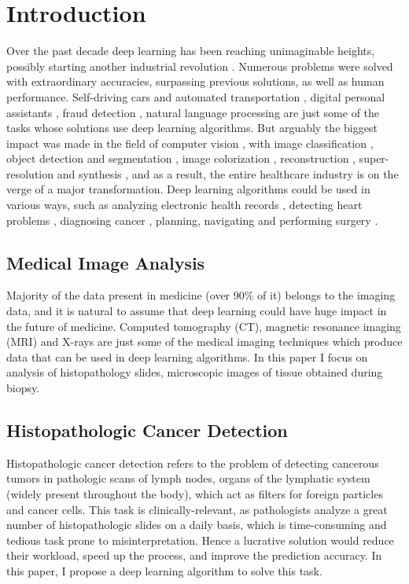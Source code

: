\chapter{Introduction}
\label{ch:intro}

Over the past decade deep learning has been reaching unimaginable heights, possibly starting another industrial revolution \cite{ml_revolution}. Numerous problems were solved with extraordinary accuracies, surpassing previous solutions, as well as human performance. Self-driving cars \cite{bojarski2016end} and automated transportation \cite{nguyen2018deep}, digital personal assistants \cite{polyakov2018investigation}, fraud detection \cite{perols2011financial}, natural language processing \cite{young2018recent} are just some of the tasks whose solutions use deep learning algorithms. But arguably the biggest impact was made in the field of computer vision \cite{voulodimos2018deep}, with image classification \cite{rawat2017deep}, object detection  and segmentation \cite{zhao2019object}, image colorization \cite{zhang2016colorful}, reconstruction \cite{wang2018image}, super-resolution \cite{dong2014learning} and synthesis \cite{reed2016generative}, and as a result, the entire healthcare industry is on the verge of a major transformation. Deep learning algorithms could be used in various ways, such as analyzing electronic health records \cite{rajkomar2018scalable}, detecting heart problems \cite{poplin2018prediction}, diagnosing cancer \cite{fakoor2013using}, planning, navigating and performing surgery \cite{shvets2018automatic}.

\section{Medical Image Analysis}

Majority of the data present in medicine (over 90\% of it) belongs to the imaging data, and it is natural to assume that deep learning could have huge impact in the future of medicine. Computed tomography (CT), magnetic resonance imaging (MRI) and X-rays are just some of the medical imaging techniques which produce data that can be used in deep learning algorithms. In this paper I focus on analysis of histopathology slides, microscopic images of tissue obtained during biopsy.

\section{Histopathologic Cancer Detection}
Histopathologic cancer detection refers to the problem of detecting cancerous tumors in pathologic scans of lymph nodes, organs of the lymphatic system (widely present throughout the body), which act as filters for foreign particles and cancer cells. This task is clinically-relevant, as pathologists analyze a great number of histopathologic slides on a daily basis, which is time-consuming and tedious task prone to misinterpretation. Hence a lucrative solution would reduce their workload, speed up the process, and improve the prediction accuracy. In this paper, I propose a deep learning algorithm to solve this task.

